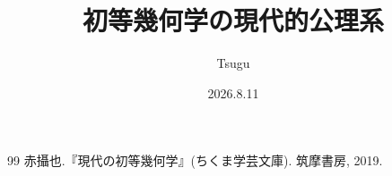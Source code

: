 \documentclass[dvipdfmx,12pt]{jbook}
\title{初等幾何学の現代的公理系}
\date{2026.8.11}
\author{Tsugu}
\theoremstyle{definition}
\theoremstyle{definition}
\begin{document}
  \maketitle
  
  \tableofcontents
  \setcounter{page}{1}
  
  
  
  
  
  
  
  
  \begin{thebibliography}{99}
     赤攝也.『現代の初等幾何学』(ちくま学芸文庫). 筑摩書房, 2019.
  \end{thebibliography}
  \clearpage
  \printindex
\end{document}
